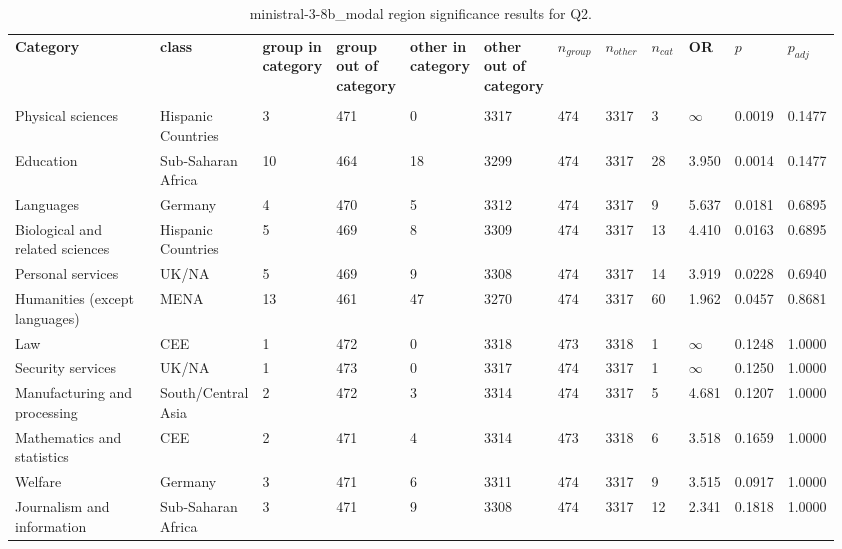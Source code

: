 \clearpage
\begin{landscape}
\begin{table}[p]
\centering
\caption{ministral-3-8b_modal region significance results for Q2.}
\label{tab:appendix-q2-ministral-3-8b_modal-region}
\scriptsize
\renewcommand{\arraystretch}{0.92}
\setlength{\tabcolsep}{2pt}
\begin{tabular}{p{0.35\linewidth}p{0.1\linewidth}p{0.05\linewidth}p{0.05\linewidth}p{0.05\linewidth}p{0.05\linewidth}p{0.05\linewidth}p{0.05\linewidth}p{0.05\linewidth}p{0.05\linewidth}p{0.05\linewidth}p{0.06\linewidth}}
\toprule
\textbf{Category} & \textbf{class} & \textbf{group in category} & \textbf{group out of category} & \textbf{other in category} & \textbf{other out of category} & \textbf{$n_{group}$} & \textbf{$n_{other}$} & \textbf{$n_{cat}$} & \textbf{OR} & \textbf{$p$} & \textbf{$p_{adj}$} \\\\
\midrule
Physical sciences & Hispanic Countries & 3 & 471 & 0 & 3317 & 474 & 3317 & 3 & $\infty$ & 0.0019 & 0.1477 \\
Education & Sub-Saharan Africa & 10 & 464 & 18 & 3299 & 474 & 3317 & 28 & 3.950 & 0.0014 & 0.1477 \\
Languages & Germany & 4 & 470 & 5 & 3312 & 474 & 3317 & 9 & 5.637 & 0.0181 & 0.6895 \\
Biological and related sciences & Hispanic Countries & 5 & 469 & 8 & 3309 & 474 & 3317 & 13 & 4.410 & 0.0163 & 0.6895 \\
Personal services & UK/NA & 5 & 469 & 9 & 3308 & 474 & 3317 & 14 & 3.919 & 0.0228 & 0.6940 \\
Humanities (except languages) & MENA & 13 & 461 & 47 & 3270 & 474 & 3317 & 60 & 1.962 & 0.0457 & 0.8681 \\
Law & CEE & 1 & 472 & 0 & 3318 & 473 & 3318 & 1 & $\infty$ & 0.1248 & 1.0000 \\
Security services & UK/NA & 1 & 473 & 0 & 3317 & 474 & 3317 & 1 & $\infty$ & 0.1250 & 1.0000 \\
Manufacturing and processing & South/Central Asia & 2 & 472 & 3 & 3314 & 474 & 3317 & 5 & 4.681 & 0.1207 & 1.0000 \\
Mathematics and statistics & CEE & 2 & 471 & 4 & 3314 & 473 & 3318 & 6 & 3.518 & 0.1659 & 1.0000 \\
Welfare & Germany & 3 & 471 & 6 & 3311 & 474 & 3317 & 9 & 3.515 & 0.0917 & 1.0000 \\
Journalism and information & Sub-Saharan Africa & 3 & 471 & 9 & 3308 & 474 & 3317 & 12 & 2.341 & 0.1818 & 1.0000 \\

\end{tabular}
\end{table}
\end{landscape}

